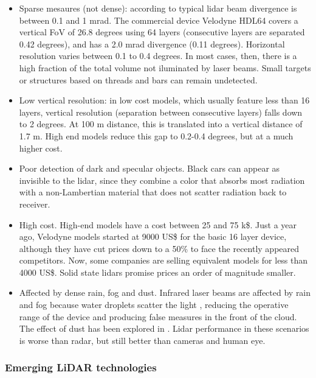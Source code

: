 \begin{itemize}
    \item Sparse mesaures (not dense): according to \cite{Gatziolis2008} typical
    lidar beam divergence is between 0.1 and 1 mrad. 
    The commercial device Velodyne HDL64 covers a vertical FoV of 26.8 degrees 
    using 64 layers (consecutive layers are separated 0.42 degrees), and has a
    2.0 mrad divergence \cite{Glennie2010} (0.11 degrees). Horizontal resolution
    varies between 0.1 to 0.4 degrees. In most cases, then, there is a high 
    fraction of the total volume not iluminated by laser beams. Small targets or
    structures based on threads and bars can remain undetected.
    
    \item Low vertical resolution: in low cost models, which usually feature 
    less than 16 layers, vertical resolution (separation between consecutive
    layers) falls down to 2 degrees. At 100 m distance, this is translated into 
    a vertical distance of 1.7 m. High end models reduce this gap to 0.2-0.4 
    degrees, but at a much higher cost.
    
    \item Poor detection of dark and specular objects. Black cars
    can appear as invisible to the lidar, since they combine a color that
    absorbs most radiation with a non-Lambertian material that does not scatter
    radiation back to receiver.
    
    \item High cost. High-end models have a cost between 25 and 75 k\$.
    Just a year ago, Velodyne models started at 9000 US\$ for the basic 16
    layer device, although they have cut prices down to a 50\% to face the
    recently appeared competitors. Now, some companies are selling
    equivalent models for less than 4000 US\$. Solid state lidars promise
    prices an order of magnitude smaller.
    
    \item Affected by dense rain, fog and dust. Infrared laser
    beams are affected by rain and fog because water droplets scatter the light 
    \cite{Wang2008}, reducing the operative range of the device and producing 
    false measures in the front of the cloud. The effect of dust has been
    explored in \cite{Phillips2017}. Lidar performance in these scenarios is 
    worse than radar, but still better than cameras and human eye.
\end{itemize}

\subsubsection{Emerging LiDAR technologies}

